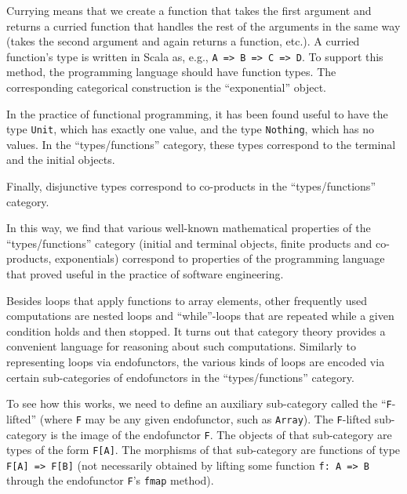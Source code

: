 Currying means that we create a function that takes the first argument
and returns a curried function that handles the rest of the arguments
in the same way (takes the second argument and again returns a function,
etc.). A curried function\textsf{'}s type is written in Scala as, e.g., \lstinline!A => B => C => D!.
To support this method, the programming language should have function
types. The corresponding categorical construction is the \textsf{``}exponential\textsf{''}
object. 

In the practice of functional programming, it has been found useful
to have the type \lstinline!Unit!, which has exactly one value, and
the type \lstinline!Nothing!, which has no values. In the \textsf{``}types/functions\textsf{''}
category, these types correspond to the terminal and the initial objects.

Finally, disjunctive types correspond to co-products in the \textsf{``}types/functions\textsf{''}
category.

In this way, we find that various well-known mathematical properties
of the \textsf{``}types/functions\textsf{''} category (initial and terminal objects,
finite products and co-products, exponentials) correspond to properties
of the programming language that proved useful in the practice of
software engineering.


Besides loops that apply functions to array elements, other frequently
used computations are nested loops and \textsf{``}while\textsf{''}-loops that are
repeated while a given condition holds and then stopped. It turns
out that category theory provides a convenient language for reasoning
about such computations. Similarly to representing loops via endofunctors,
the various kinds of loops are encoded via certain sub-categories
of endofunctors in the \textsf{``}types/functions\textsf{''} category.

To see how this works, we need to define an auxiliary sub-category
called the \textsf{``}\lstinline!F!-lifted\textsf{''} (where \lstinline!F! may be
any given endofunctor, such as \lstinline!Array!). The \lstinline!F!-lifted
sub-category is the image of the endofunctor \lstinline!F!. The objects
of that sub-category are types of the form \lstinline!F[A]!. The
morphisms of that sub-category are functions of type \lstinline!F[A] => F[B]!
(not necessarily obtained by lifting some function \lstinline!f: A => B!
through the endofunctor \lstinline!F!\textsf{'}s \lstinline!fmap! method). 

